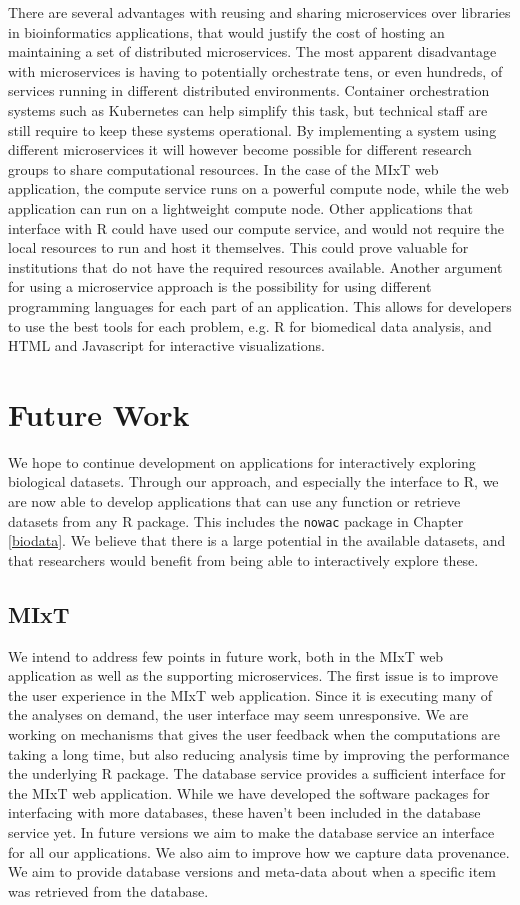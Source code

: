 There are several advantages with reusing and sharing microservices over
libraries in bioinformatics applications, that would justify the cost of hosting
an maintaining a set of distributed microservices.
The most apparent disadvantage with microservices is having to
potentially orchestrate tens, or even hundreds, of services running in different
distributed environments. 
Container orchestration systems such as Kubernetes can help simplify this task,
but technical staff are still require to keep these systems operational. By
implementing a system using different microservices it will however become
possible for different research groups to share computational resources. In the
case of the MIxT web application, the compute service runs on a powerful compute
node, while the web application can run on a lightweight compute node. Other
applications that interface with R could have used our compute service, and would
not require the local resources to run and host it themselves. This could prove
valuable for institutions that do not have the required resources available.
Another argument for using a microservice approach is the possibility for using
different programming languages for each part of an application. This allows for
developers to use the best tools for each problem, e.g. R for biomedical data
analysis, and HTML and Javascript for interactive visualizations. 

\section{Future Work} 
We hope to continue development on applications for interactively exploring
biological datasets. Through our approach, and especially the interface to R, 
we are now able to develop applications that can use any function or retrieve
datasets from any R package. This includes the \texttt{nowac} package in
Chapter \ref{biodata}. We believe that there is a large potential in the
available datasets, and that researchers would benefit from being able to
interactively explore these. 

\subsection{MIxT} 
We intend to address few points in future work, both in the
MIxT web application as well as the supporting microservices.  The first issue
is to improve the user experience in the MIxT web application.  Since it is
executing many of the analyses on demand, the user interface may seem
unresponsive. We are working on mechanisms that gives the user feedback when the
computations are taking a long time, but also reducing analysis time by
improving the performance the underlying R package. The database service
provides a sufficient interface for the MIxT web application. While we have
developed the software packages for interfacing with more databases, these
haven't been included in the database service yet. In future versions we aim to
make the database service an interface for all our applications.  We also aim to
improve how we capture data provenance. We aim to provide database versions and
meta-data about when a specific item was retrieved from the database. 


